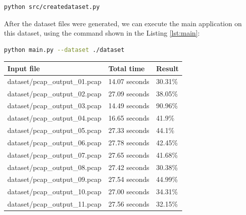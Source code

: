 \documentclass[
  printed,     %
  color,       %
  oneside,     %
  nosansbold,  %
  nocolorbold, %
  nolof,         %
  nolot,         %
]{fithesis4}
\begin{document}
\begin{lstlisting}[language=bash, caption={Generate the dataset files}, label={lst:ds}]
python src/createdataset.py
\end{lstlisting}

After the dataset files were generated, we can execute the main application on this dataset, using the command shown in the Listing \ref{lst:main}:

\begin{lstlisting}[language=bash, caption={Run the main application on the dataset}, label={lst:main}]
python main.py --dataset ./dataset
\end{lstlisting}

\begin{table}[]
\begin{tabular}{lll}
\hline
\textbf{Input file}                                & \textbf{Total time}                & \textbf{Result} \\ \hline
\multicolumn{1}{l|}{dataset/pcap\_output\_01.pcap} & \multicolumn{1}{l|}{14.07 seconds} & 30.31\%         \\
\multicolumn{1}{l|}{dataset/pcap\_output\_02.pcap} & \multicolumn{1}{l|}{27.09 seconds} & 38.05\%         \\
\multicolumn{1}{l|}{dataset/pcap\_output\_03.pcap} & \multicolumn{1}{l|}{14.49 seconds} & 90.96\%         \\
\multicolumn{1}{l|}{dataset/pcap\_output\_04.pcap} & \multicolumn{1}{l|}{16.65 seconds} & 41.9\%         \\
\multicolumn{1}{l|}{dataset/pcap\_output\_05.pcap} & \multicolumn{1}{l|}{27.33 seconds} & 44.1\%         \\
\multicolumn{1}{l|}{dataset/pcap\_output\_06.pcap} & \multicolumn{1}{l|}{27.78 seconds} & 42.45\%         \\
\multicolumn{1}{l|}{dataset/pcap\_output\_07.pcap} & \multicolumn{1}{l|}{27.65 seconds} & 41.68\%         \\
\multicolumn{1}{l|}{dataset/pcap\_output\_08.pcap} & \multicolumn{1}{l|}{27.42 seconds} & 30.38\%         \\
\multicolumn{1}{l|}{dataset/pcap\_output\_09.pcap} & \multicolumn{1}{l|}{27.54 seconds} & 44.99\%         \\
\multicolumn{1}{l|}{dataset/pcap\_output\_10.pcap} & \multicolumn{1}{l|}{27.00 seconds} & 34.31\%         \\
\multicolumn{1}{l|}{dataset/pcap\_output\_11.pcap} & \multicolumn{1}{l|}{27.56 seconds} & 32.15\%         \\

\end{tabular}
\end{table}
\end{document}
